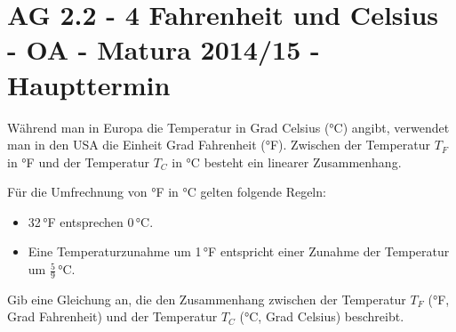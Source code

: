 \section{AG 2.2 - 4 Fahrenheit und Celsius - OA - Matura 2014/15 - Haupttermin}

\begin{beispiel}[AG 2.2]{1} %
Während man in Europa die Temperatur in Grad Celsius (°C) angibt, verwendet man in den USA
die Einheit Grad Fahrenheit (°F). Zwischen der Temperatur $T_F$ in °F und der Temperatur $T_C$ in °C besteht ein linearer Zusammenhang. \leer

Für die Umfrechnung von °F in °C gelten folgende Regeln:
\begin{itemize}
	\item 32\,°F entsprechen 0\,°C.
	\item Eine Temperaturzunahme um 1\,°F entspricht einer Zunahme der Temperatur um $\frac{5}{9}$\,°C. 
\end{itemize}

Gib eine Gleichung an, die den Zusammenhang zwischen der Temperatur $T_F$ (°F, Grad Fahrenheit) und der Temperatur $T_C$ (°C, Grad Celsius) beschreibt.


\end{beispiel}